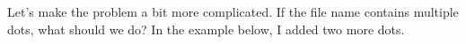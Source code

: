 Let's make the problem a bit more complicated. If the file name contains multiple dots, what should we do? In the example below, I added two more dots.